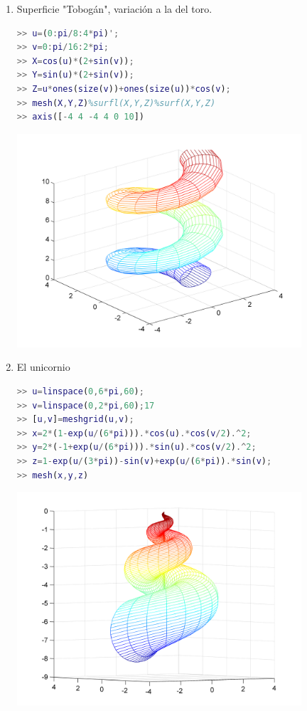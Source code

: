 \begin{enumerate}
\item Superficie "Tobogán", variación a la del toro. 

\begin{lstlisting}[language=Matlab]
>> u=(0:pi/8:4*pi)'; 
>> v=0:pi/16:2*pi;
>> X=cos(u)*(2+sin(v)); 
>> Y=sin(u)*(2+sin(v)); 
>> Z=u*ones(size(v))+ones(size(u))*cos(v); 
>> mesh(X,Y,Z)%surfl(X,Y,Z)%surf(X,Y,Z) 
>> axis([-4 4 -4 4 0 10]) 
\end{lstlisting}
\includegraphics[width=300pt]{./Imagenes/tobogan.png}


\item El unicornio
\begin{lstlisting}[language=Matlab]
>> u=linspace(0,6*pi,60);
>> v=linspace(0,2*pi,60);17
>> [u,v]=meshgrid(u,v);
>> x=2*(1-exp(u/(6*pi))).*cos(u).*cos(v/2).^2;
>> y=2*(-1+exp(u/(6*pi))).*sin(u).*cos(v/2).^2;
>> z=1-exp(u/(3*pi))-sin(v)+exp(u/(6*pi)).*sin(v);
>> mesh(x,y,z)
\end{lstlisting}
\includegraphics[width=300pt]{./Imagenes/unicornio.png}



\end{enumerate}
